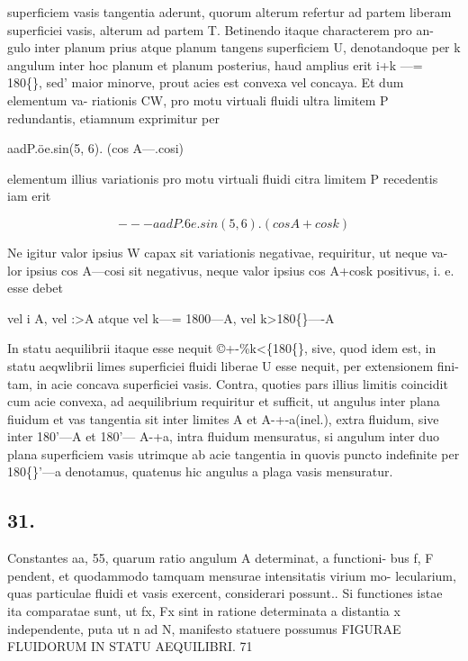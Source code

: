 \documentclass[12pt,a4paper]{article}
\begin{document}
superficiem vasis tangentia aderunt, quorum alterum refertur ad partem liberam
superficiei vasis, alterum ad partem T. Betinendo itaque characterem   pro an-
gulo inter planum prius atque planum tangens superficiem U, denotandoque per
k angulum inter hoc planum et planum posterius, haud amplius erit i+k ---= 180\textdegree\{\},
sed' maior minorve, prout acies est convexa vel concaya. Et dum elementum va-
riationis    CW, pro motu virtuali fluidi ultra limitem P redundantis, etiamnum
exprimitur per

aadP.öe.sin(5, 6). (cos A---.cosi)

elementum illius variationis pro motu virtuali fluidi citra limitem P recedentis
iam erit

\[                           ---aadP.6e.sin(5, 6). (cos A+ cos k)\]

Ne   igitur valor ipsius    W capax sit variationis negativae, requiritur, ut neque va-
lor ipsius cos A---cosi        sit negativus, neque valor ipsius cos A+cosk             positivus,
i. e. esse debet

vel    i     A,               vel   :>A
atque vel    k---= 1800---A,            vel   k>180\textdegree\{\}----A

In statu aequilibrii itaque esse nequit ©+-\%k<\{180\textdegree\{\}, sive, quod idem est, in
statu aeqwlibrii limes superficiei fluidi liberae U esse nequit, per extensionem fini-
tam, in acie concava superficiei vasis.        Contra, quoties pars illius limitis coincidit
cum acie convexa, ad aequilibrium requiritur et sufficit, ut angulus inter plana
fiuidum et vas tangentia sit inter limites A et A-+-a(inel.), extra fluidum, sive
inter   180'---A et 180'--- A-+a,                intra fluidum mensuratus, si angulum inter
duo plana superficiem vasis utrimque ab acie tangentia in quovis puncto indefinite
per 180\textdegree\{\}'---a denotamus, quatenus hic angulus a plaga vasis mensuratur.


\subsection*{31.}

Constantes     aa, 55,    quarum ratio angulum          A      determinat, a functioni-
bus f, F pendent, et quodammodo tamquam mensurae intensitatis virium mo-
lecularium,    quas particulae fluidi et vasis exercent,            considerari possunt..     Si
functiones    istae ita comparatae      sunt, ut fx, Fx         sint    in ratione determinata
a distantia    x independente, puta ut           n ad N,       manifesto statuere possumus
FIGURAE   FLUIDORUM    IN STATU AEQUILIBRI.                    71
\end{document}
